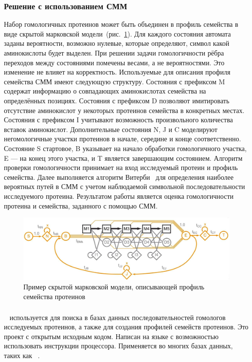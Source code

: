 \subsubsection{Решение с использованием СММ}
\label{HMM_solution}
Набор гомологичных протеинов может быть объединен в профиль семейства в виде 
скрытой марковской модели~\cite{HMM_Eddy}(рис.~\ref{HMM_example}).
Для каждого состояния автомата заданы вероятности, возможно нулевые, которые 
определяют, символ какой аминокислоты будет выделен.
При решении задачи гомологичности рёбра переходов между состояниями помечены
весами, а не вероятностями.
Это изменение не влияет на корректность.
Используемые для описания профиля семейства СММ имеют следующую структуру.
Состояния с префиксом M содержат информацию о совпадающих аминокислотах 
семейства на определённых позициях.
Состояния с префиксом D позволяют имитировать отсутствие аминокислот у 
некоторых протеинов семейства в конкретных местах.
Состояния с префиксом I учитывают возможность произвольного количества 
вставок аминокислот.
Дополнительные состояния N, J и C моделируют негомологичные участки протеинов в 
начале, середине и конце соответственно.
Состояние S стартовое, B указывает на начало обработки гомологичного участка, E --- на конец этого участка, и T является завершающим состоянием.
Алгоритм проверки гомологичности принимает на вход исследуемый протеин и 
профиль семейства.
Далее выполняется алгоритм Витерби~\cite{Viterbi} для определения наиболее 
вероятных путей в СММ с учетом наблюдаемой символьной последовательности 
исследуемого протеина.
Результатом работы является оценка гомологичности протеина и 
семейства, заданного с помощью СММ.

\begin{figure}
  \centering
  \includegraphics[width=\columnwidth]{HMM.png}
  \caption{Пример скрытой марковской модели, описывающей профиль семейства
   протеинов~\cite{MSV_Eddy}}
  \label{HMM_example}
\end{figure}

\subsubsection{}
~\cite{HMMer} используется для поиска в базах данных 
последовательностей гомологов исследуемых протеинов, а также для создания 
профилей семейств протеинов.
Это проект с открытым исходным кодом.
Написан на языке  с возможностью использовать  инструкции 
процессора.
Применяется во многих базах данных, таких как ~\cite{Pfam}.


